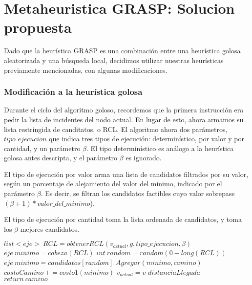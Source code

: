 \section{Metaheuristica GRASP: Solucion propuesta}

Dado que la heur\'istica GRASP es una combinaci\'on entre una heur\'istica golosa aleatorizada y una b\'usqueda local, decidimos utilizar nuestras heur\'isticas previamente mencionadas, con algunas modificaciones.

\subsubsection{Modificaci\'on a la heur\'istica golosa}

\vspace{2mm}

Durante el ciclo del algoritmo goloso, recordemos que la primera instrucci\'on era pedir la lista de incidentes del nodo actual. En lugar de esto, ahora armamos su lista restringida de canditatos, o RCL. El algoritmo ahora dos par\'ametros, $tipo\_ejecucion$ que indica tres tipos de ejecuci\'on: determin\'istico, por valor y por cantidad, y un par\'ametro $\beta$. El tipo determin\'istico es an\'alogo a la heur\'istica golosa antes descripta, y el par\'ametro $\beta$ es ignorado.

\vspace{2mm}

El tipo de ejecuci\'on por valor arma una lista de candidatos filtrados por su valor, seg\'un un porcentaje de alejamiento del valor del m\'inimo, indicado por el par\'ametro $\beta$. Es decir, se filtran los candidatos factibles cuyo valor sobrepase $(\beta + 1)*valor\_del\_minimo$).

\vspace{2mm}

El tipo de ejecuci\'on por cantidad toma la lista ordenada de candidatos, y toma los $\beta$ mejores candidatos.

\vspace{2mm}

\begin{algorithmic}

	\State $ list<eje> \: RCL = obtenerRCL(v_{actual}, g, tipo\_ejecucion, \beta) $
    		 \State $eje \: minimo = cabeza(RCL)$    
			\State $int \: random = random(0 - long(RCL))$
			\State $eje \: minimo = candidatos[random]$
	\EndIf
	\State $ Agregar(minimo, camino) $
	\State $ costoCamino \: += costo1(minimo) $
	\State $ v_{actual} = v $
	\State $distanciaLlegada--$
\EndWhile
\State $ return \: camino $
\end{algorithmic}

